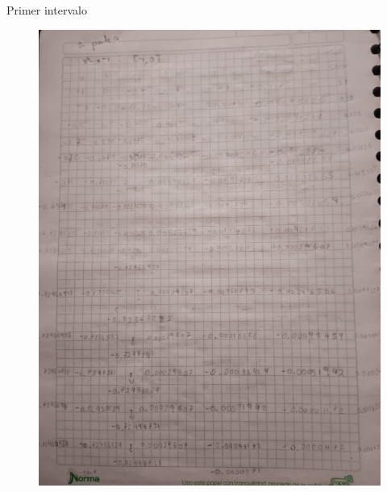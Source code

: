 \documentclass[12pt]{article}
\begin{document}
Primer intervalo
\begin{figure}[H]
\centering
\includegraphics[width=1\textwidth]{./inFiles/Figures/8.jpeg}
\end{figure}
\end{document}
